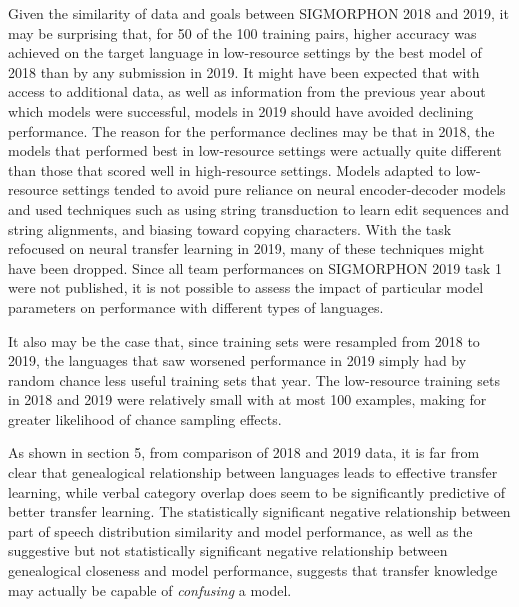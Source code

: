 Given the similarity of data and goals between SIGMORPHON 2018 and 2019, it may be surprising that, for 50 of the 100 training pairs, higher accuracy was achieved on the target language in low-resource settings by the best model of 2018 than by any submission in 2019. It might have been expected that with access to additional data, as well as information from the previous year about which models were successful, models in 2019 should have avoided declining performance. The reason for the performance declines may be that in 2018, the models that performed best in low-resource settings were actually quite different than those that scored well in high-resource settings. Models adapted to low-resource settings tended to avoid pure reliance on neural encoder-decoder models and used techniques such as using string transduction to learn edit sequences and string alignments, and biasing toward copying characters. With the task refocused on neural transfer learning in 2019, many of these techniques might have been dropped. Since all team performances on SIGMORPHON 2019 task 1 were not published, it is not possible to assess the impact of particular model parameters on performance with different types of languages. 

It also may be the case that, since training sets were resampled from 2018 to 2019, the languages that saw worsened performance in 2019 simply had by random chance less useful training sets that year. The low-resource training sets in 2018 and 2019 were relatively small with at most 100 examples, making for greater likelihood of chance sampling effects.

As shown in section 5, from comparison of 2018 and 2019 data, it is far from clear that genealogical relationship between languages leads to effective transfer learning, while verbal category overlap does seem to be significantly predictive of better transfer learning. The statistically significant negative relationship between part of speech distribution similarity and model performance, as well as the suggestive but not statistically significant negative relationship between genealogical closeness and model performance, suggests that transfer knowledge may actually be capable of \textit{confusing} a model. 



